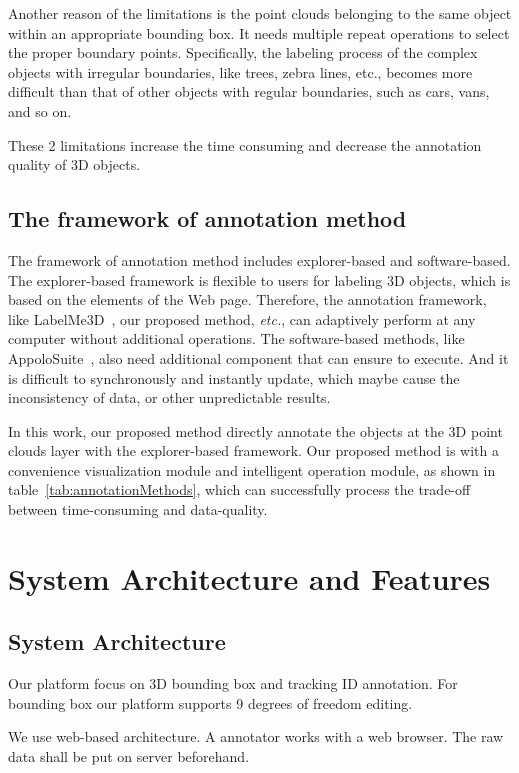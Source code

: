 \documentclass[letterpaper, 10 pt, conference]{ieeeconf}  %
\begin{document}
Another reason of the limitations is the point clouds belonging to the same object within an appropriate bounding box.
It needs multiple repeat operations to select the proper boundary points.
Specifically, the labeling process of the complex objects with irregular boundaries, like trees, zebra lines, etc., becomes more difficult than that of other objects with regular boundaries, such as cars, vans, and so on.

These 2 limitations increase the time consuming and decrease the annotation quality of 3D objects.
\subsection{The framework of annotation method}
The framework of annotation method includes explorer-based and software-based. The explorer-based framework is flexible to users for labeling 3D objects, which is based on the elements of the Web page. Therefore, the annotation framework, like LabelMe3D~\cite{LabelMe3D}, our proposed method, \emph{etc.}, can adaptively perform at any computer without additional operations. The software-based methods, like AppoloSuite~\cite{SUPERVISELY,wang2019apolloscape}, also need additional component that can ensure to execute. And it is difficult to synchronously and instantly update, which maybe cause the inconsistency of data, or other unpredictable results.

In this work, our proposed method directly annotate the objects at the 3D point clouds layer with the explorer-based framework. Our proposed method is with a convenience visualization module and intelligent operation module, as shown in table~\ref{tab:annotationMethods}, which can successfully process the trade-off between time-consuming and data-quality.

\section{System Architecture and Features}

\subsection{System Architecture}
Our platform focus on 3D bounding box and tracking ID annotation. For bounding box our platform supports 9 degrees of freedom editing. 

We use web-based architecture. A annotator works with a web browser. The raw data shall be put on server beforehand. 
\end{document}
